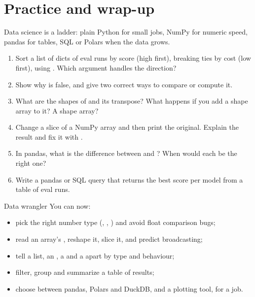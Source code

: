 \section{Practice and wrap-up}

Data science is a ladder: plain Python for small jobs, NumPy for numeric speed, pandas for tables,
SQL or Polars when the data grows.

\begin{practice}
\begin{enumerate}[leftmargin=*]
\item Sort a list of dicts of eval runs by score (high first), breaking ties by cost (low first),
using . Which argument handles the direction?
\item Show why  is false, and give two correct ways to compare or compute it.
\item What are the shapes of  and its transpose? What happens if you
add a shape  array to it? A shape  array?
\item Change a slice of a NumPy array and then print the original. Explain the result and fix it
with .
\item In pandas, what is the difference between  and ? When would
each be the right one?
\item Write a pandas or SQL query that returns the best score per model from a table of eval runs.
\end{enumerate}
\end{practice}

\begin{achievement}{Data wrangler}
You can now:
\begin{itemize}[leftmargin=*]
\item pick the right number type (, , ) and avoid float comparison bugs;
\item read an array's , reshape it, slice it, and predict broadcasting;
\item tell a list, an , a  and a  apart by type and behaviour;
\item filter, group and summarize a table of results;
\item choose between pandas, Polars and DuckDB, and a plotting tool, for a job.
\end{itemize}
\end{achievement}
